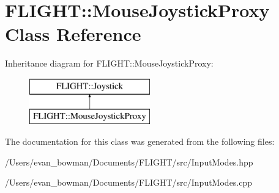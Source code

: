\hypertarget{class_f_l_i_g_h_t_1_1_mouse_joystick_proxy}{}\section{F\+L\+I\+G\+HT\+:\+:Mouse\+Joystick\+Proxy Class Reference}
\label{class_f_l_i_g_h_t_1_1_mouse_joystick_proxy}
Inheritance diagram for F\+L\+I\+G\+HT\+:\+:Mouse\+Joystick\+Proxy\+:\begin{figure}[H]
\begin{center}
\leavevmode
\includegraphics[height=2.000000cm]{class_f_l_i_g_h_t_1_1_mouse_joystick_proxy}
\end{center}
\end{figure}


The documentation for this class was generated from the following files\+:\begin{DoxyCompactItemize}
\item 
/\+Users/evan\+\_\+bowman/\+Documents/\+F\+L\+I\+G\+H\+T/src/Input\+Modes.\+hpp\item 
/\+Users/evan\+\_\+bowman/\+Documents/\+F\+L\+I\+G\+H\+T/src/Input\+Modes.\+cpp\end{DoxyCompactItemize}
